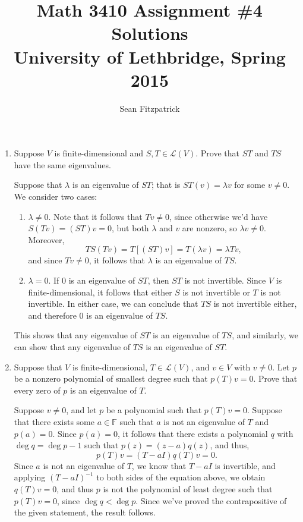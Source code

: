 \documentclass[letterpaper,12pt]{article}
\title{Math 3410 Assignment \#4 Solutions\\University of Lethbridge, Spring 2015}
\author{Sean Fitzpatrick}
\begin{document}
 \maketitle


\begin{enumerate}
 \item Suppose $V$ is finite-dimensional and $S,T\in\mathcal{L}(V)$. Prove that $ST$ and $TS$ have the same eigenvalues.

\bigskip

Suppose that $\lambda$ is an eigenvalue of $ST$; that is $ST(v) = \lambda v$ for some $v\neq 0$. We consider two cases:
\begin{enumerate}
 \item $\lambda\neq 0$. Note that it follows that $Tv\neq 0$, since otherwise we'd have $S(Tv) = (ST)v=0$, but both $\lambda$ and $v$ are nonzero, so $\lambda v\neq 0$. Moreover,
\[
 TS(Tv) = T[(ST)v] = T(\lambda v) = \lambda Tv,
\]
and since $Tv\neq 0$, it follows that $\lambda$ is an eigenvalue of $TS$. 

 \item $\lambda = 0$. If 0 is an eigenvalue of $ST$, then $ST$ is not invertible. Since $V$ is finite-dimensional, it follows that either $S$ is not invertible or $T$ is not invertible. In either case, we can conclude that $TS$ is not invertible either, and therefore 0 is an eigenvalue of $TS$.
\end{enumerate}
This shows that any eigenvalue of $ST$ is an eigenvalue of $TS$, and similarly, we can show that any eigenvalue of $TS$ is an eigenvalue of $ST$.

\bigskip

 \item Suppose that $V$ is finite-dimensional, $T\in\mathcal{L}(V)$, and $v\in V$ with $v\neq 0$. Let $p$ be a nonzero polynomial of smallest degree such that $p(T)v=0$. Prove that every zero of $p$ is an eigenvalue of $T$.

\bigskip

Suppose $v\neq 0$, and let $p$ be a polynomial such that $p(T)v=0$. Suppose that there exists some $a\in\mathbb{F}$ such that $a$ is not an eigenvalue of $T$ and $p(a)=0$. Since $p(a)=0$, it follows that there exists a polynomial $q$ with $\deg q = \deg p-1$ such that $p(z) = (z-a)q(z)$, and thus,
\[
 p(T)v = (T-aI)q(T)v = 0.
\]
Since $a$ is not an eigenvalue of $T$, we know that $T-aI$ is invertible, and applying $(T-aI)^{-1}$ to both sides of the equation above, we obtain $q(T)v=0$, and thus $p$ is not the polynomial of least degree such that $p(T)v=0$, since $\deg q<\deg p$. Since we've proved the contrapositive of the given statement, the result follows.


\end{enumerate}
\end{document}
